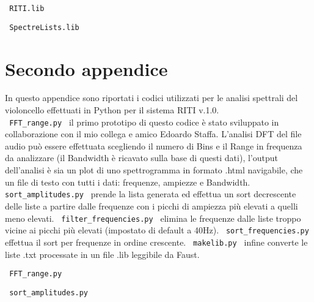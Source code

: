 \begin{center} \Large \verb| RITI.lib | \normalsize \\
    \vspace{0.2cm} \end{center}

\clearpage

\begin{center} \Large \verb| SpectreLists.lib | \normalsize \\
    \vspace{0.2cm} \end{center}

\clearpage

\section{Secondo appendice}

In questo appendice sono riportati i codici utilizzati per le analisi 
spettrali del violoncello effettuati in Python per il sistema RITI v.1.0. \\
\verb| FFT_range.py | il primo prototipo di questo codice è stato sviluppato
in collaborazione con il mio collega e amico Edoardo Staffa. 
L'analisi DFT del file audio può essere effettuata scegliendo il numero di Bins e 
il Range in frequenza da analizzare (il Bandwidth è ricavato sulla base di questi dati),
l'output dell'analisi è sia un plot di uno spettrogramma in formato .html navigabile,
che un file di testo con tutti i dati: frequenze, ampiezze e Bandwidth.
\verb| sort_amplitudes.py | prende la lista generata ed effettua un sort
decrescente delle liste a partire dalle frequenze con i picchi di ampiezza più 
elevati a quelli meno elevati. \verb| filter_frequencies.py | elimina le frequenze 
dalle liste troppo vicine ai picchi più elevati (impostato di default a 40Hz).
\verb| sort_frequencies.py | effettua il sort per frequenze in ordine crescente.
\verb| makelib.py | infine converte le liste .txt processate in un file .lib leggibile da Faust.
\clearpage


\begin{center} \Large \verb| FFT_range.py | \normalsize \\
    \vspace{0.2cm} \end{center}

\clearpage

\begin{center} \Large \verb| sort_amplitudes.py | \normalsize \\
    \vspace{0.2cm} \end{center}

\clearpage

